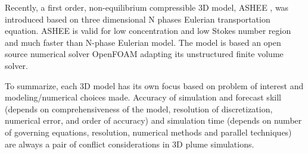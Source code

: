 \documentclass[journal abbreviation, manuscript]{copernicus}
\begin{document}
Recently, a first order, non-equilibrium compressible 3D model, ASHEE \citep{cerminara2016ashee}, was introduced based on three dimensional N phases Eulerian transportation equation. ASHEE is valid for low concentration and low Stokes number region and much faster than N-phase Eulerian model. The model is based an open source numerical solver OpenFOAM adapting its unstructured finite volume solver.

To summarize, each 3D model has its own focus based on problem of interest and modeling/numerical choices made.
 Accuracy of simulation and forecast skill (depends on comprehensiveness of the model, resolution of discretization, numerical error, and order of accuracy) and simulation time (depends on number of governing equations, resolution, numerical methods and parallel techniques) are always a pair of conflict considerations in 3D plume simulations.\\
\end{document}
